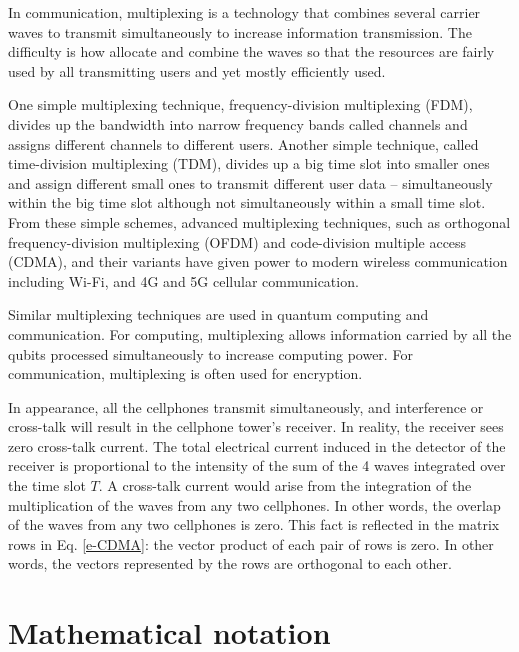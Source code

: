 \documentclass[oneside, letter, 12pt]{book}
\begin{document}
In communication, multiplexing is a technology that combines several carrier waves to transmit simultaneously to increase information transmission. The difficulty is how allocate and combine the waves so that the resources are fairly used by all transmitting users and yet mostly efficiently used.

One simple multiplexing technique, frequency-division multiplexing (FDM), divides up the bandwidth into narrow frequency bands called channels and assigns different channels to different users. Another simple technique, called time-division multiplexing (TDM), divides up a big time slot into smaller ones and assign different small ones to transmit different user data -- simultaneously within the big time slot although not simultaneously within a small time slot. From these simple schemes, advanced multiplexing techniques, such as orthogonal frequency-division multiplexing (OFDM) and code-division multiple access (CDMA), and their variants have given power to modern wireless communication including Wi-Fi, and 4G and 5G cellular communication.

Similar multiplexing techniques are used in quantum computing and communication. For computing, multiplexing allows information carried by all the qubits processed simultaneously to increase computing power. For communication, multiplexing is often used for encryption.

In appearance, all the cellphones transmit simultaneously, and interference or cross-talk will result in the cellphone tower's receiver. In reality, the receiver sees zero cross-talk current. The total electrical current induced in the detector of the receiver is proportional to the intensity of the sum of the 4 waves integrated over the time slot $T$. A cross-talk current would arise from the integration of the multiplication of the waves from any two cellphones. In other words, the overlap of the waves from any two cellphones is zero. This fact is reflected in the matrix rows in Eq. \ref{e-CDMA}: the vector product of each pair of rows is zero. In other words, the vectors represented by the rows are orthogonal to each other. 

\section{Mathematical notation}
\end{document}
